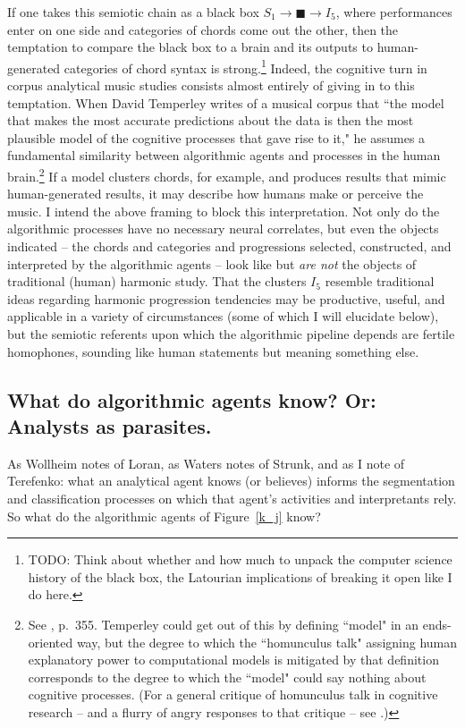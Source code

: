 If one takes this semiotic chain as a black box $S_1 \rightarrow \blacksquare \rightarrow I_5$, where performances enter on one side and categories of chords come out the other, then the temptation to compare the black box to a brain and its outputs to human-generated categories of chord syntax is strong.\footnote{TODO: Think about whether and how much to unpack the computer science history of the black box, the Latourian implications of breaking it open like I do here.}  Indeed, the cognitive turn in corpus analytical music studies consists almost entirely of giving in to this temptation.  When David Temperley writes of a musical corpus that ``the model that makes the most accurate predictions about the data is then the most plausible model of the cognitive processes that gave rise to it," he assumes a fundamental similarity between algorithmic agents and processes in the human brain.\footnote{See \cite{temperley2010}, p.\ 355.  Temperley could get out of this by defining ``model" in an ends-oriented way, but the degree to which the ``homunculus talk" assigning human explanatory power to computational models is mitigated by that definition corresponds to the degree to which the ``model" could say nothing about cognitive processes.  (For a general critique of homunculus talk in cognitive research -- and a flurry of angry responses to that critique -- see \cite{mcginn2013}.)}  If a model clusters chords, for example, and produces results that mimic human-generated results, it may describe how humans make or perceive the music.  I intend the above framing to block this interpretation.  Not only do the algorithmic processes have no necessary neural correlates, but even the objects indicated -- the chords and categories and progressions selected, constructed, and interpreted by the algorithmic agents -- look like but \emph{are not} the objects of traditional (human) harmonic study.  That the clusters $I_5$ resemble traditional ideas regarding harmonic progression tendencies may be productive, useful, and applicable in a variety of circumstances (some of which I will elucidate below), but the semiotic referents upon which the algorithmic pipeline depends are fertile homophones, sounding like human statements but meaning something else.

\subsection{What do algorithmic agents know?  Or: Analysts as parasites.}
As Wollheim notes of Loran, as Waters notes of Strunk, and as I note of Terefenko: what an analytical agent knows (or believes) informs the segmentation and classification processes on which that agent's activities and interpretants rely.  So what do the algorithmic agents of Figure~\ref{k_j} know?

